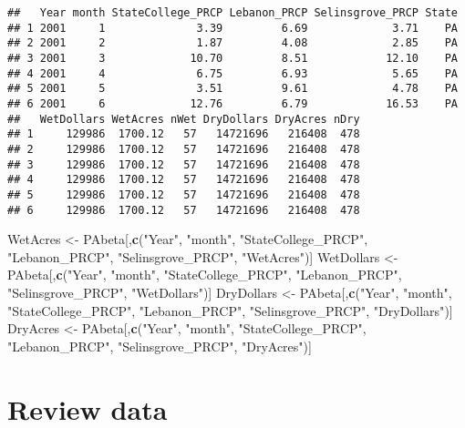 \documentclass[]{article}
\newenvironment{Shaded}{\begin{snugshade}}{\end{snugshade}}
\newcommand{\KeywordTok}[1]{\textcolor[rgb]{0.13,0.29,0.53}{\textbf{{#1}}}}
\newcommand{\StringTok}[1]{\textcolor[rgb]{0.31,0.60,0.02}{{#1}}}
\newcommand{\NormalTok}[1]{{#1}}
\begin{document}
\begin{verbatim}
##   Year month StateCollege_PRCP Lebanon_PRCP Selinsgrove_PRCP State
## 1 2001     1              3.39         6.69             3.71    PA
## 2 2001     2              1.87         4.08             2.85    PA
## 3 2001     3             10.70         8.51            12.10    PA
## 4 2001     4              6.75         6.93             5.65    PA
## 5 2001     5              3.51         9.61             4.78    PA
## 6 2001     6             12.76         6.79            16.53    PA
##   WetDollars WetAcres nWet DryDollars DryAcres nDry
## 1     129986  1700.12   57   14721696   216408  478
## 2     129986  1700.12   57   14721696   216408  478
## 3     129986  1700.12   57   14721696   216408  478
## 4     129986  1700.12   57   14721696   216408  478
## 5     129986  1700.12   57   14721696   216408  478
## 6     129986  1700.12   57   14721696   216408  478
\end{verbatim}

\begin{Shaded}
\begin{Highlighting}[]
\NormalTok{WetAcres <-}\StringTok{ }\NormalTok{PAbeta[,}\KeywordTok{c}\NormalTok{(}\StringTok{"Year"}\NormalTok{, }\StringTok{"month"}\NormalTok{, }\StringTok{"StateCollege_PRCP"}\NormalTok{, }\StringTok{"Lebanon_PRCP"}\NormalTok{, }\StringTok{"Selinsgrove_PRCP"}\NormalTok{, }\StringTok{"WetAcres"}\NormalTok{)]}
\NormalTok{WetDollars <-}\StringTok{ }\NormalTok{PAbeta[,}\KeywordTok{c}\NormalTok{(}\StringTok{"Year"}\NormalTok{, }\StringTok{"month"}\NormalTok{, }\StringTok{"StateCollege_PRCP"}\NormalTok{, }\StringTok{"Lebanon_PRCP"}\NormalTok{, }\StringTok{"Selinsgrove_PRCP"}\NormalTok{, }\StringTok{"WetDollars"}\NormalTok{)]}
\NormalTok{DryDollars <-}\StringTok{ }\NormalTok{PAbeta[,}\KeywordTok{c}\NormalTok{(}\StringTok{"Year"}\NormalTok{, }\StringTok{"month"}\NormalTok{, }\StringTok{"StateCollege_PRCP"}\NormalTok{, }\StringTok{"Lebanon_PRCP"}\NormalTok{, }\StringTok{"Selinsgrove_PRCP"}\NormalTok{, }\StringTok{"DryDollars"}\NormalTok{)]}
\NormalTok{DryAcres <-}\StringTok{ }\NormalTok{PAbeta[,}\KeywordTok{c}\NormalTok{(}\StringTok{"Year"}\NormalTok{, }\StringTok{"month"}\NormalTok{, }\StringTok{"StateCollege_PRCP"}\NormalTok{, }\StringTok{"Lebanon_PRCP"}\NormalTok{, }\StringTok{"Selinsgrove_PRCP"}\NormalTok{, }\StringTok{"DryAcres"}\NormalTok{)]}
\end{Highlighting}
\end{Shaded}

\section{Review data}\label{review-data}
\end{document}
